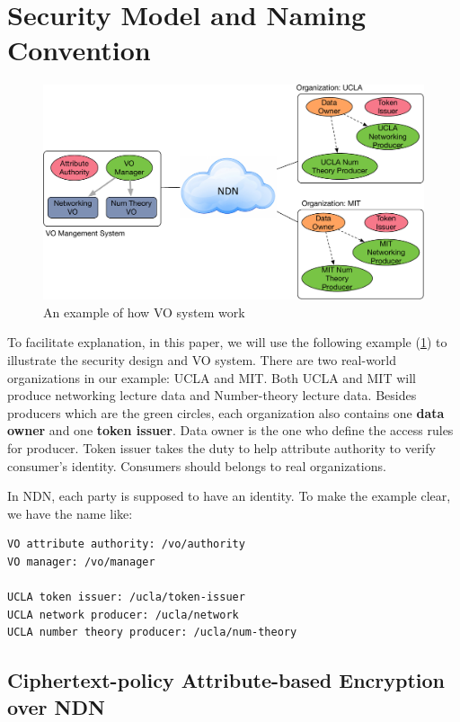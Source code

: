 \section{Security Model and Naming Convention}

\begin{figure}[t]
  \centering
  \includegraphics[scale=0.5]{figures/example}
  \vspace{-3mm}
  \caption{An example of how VO system work}
  \label{fig:example}
\end{figure}

To facilitate explanation, in this paper, we will use the following example (\ref{fig:example}) to illustrate the security design and VO system.
There are two real-world organizations in our example: UCLA and MIT.
Both UCLA and MIT will produce networking lecture data and Number-theory lecture data.
Besides producers which are the green circles, each organization also contains one \textbf{data owner} and one \textbf{token issuer}.
Data owner is the one who define the access rules for producer.
Token issuer takes the duty to help attribute authority to verify consumer's identity.
Consumers should belongs to real organizations.

In NDN, each party is supposed to have an identity.
To make the example clear, we have the name like:

\begin{verbatim}
VO attribute authority: /vo/authority
VO manager: /vo/manager

UCLA token issuer: /ucla/token-issuer
UCLA network producer: /ucla/network
UCLA number theory producer: /ucla/num-theory
\end{verbatim}

\subsection{Ciphertext-policy Attribute-based Encryption over NDN}

